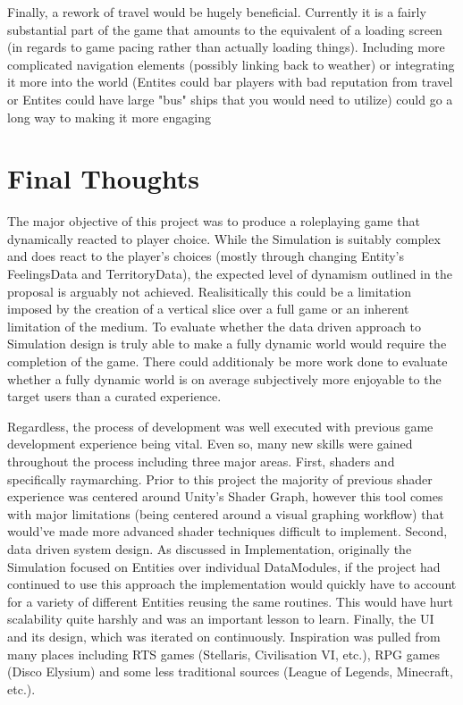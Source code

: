 \documentclass{report}
\begin{document}
Finally, a rework of travel would be hugely beneficial. Currently it is a fairly substantial part of the game that amounts to the equivalent of a loading screen (in regards to game pacing rather than actually loading things). Including more complicated navigation elements (possibly linking back to weather) or integrating it more into the world (Entites could bar players with bad reputation from travel or Entites could have large "bus" ships that you would need to utilize) could go a long way to making it more engaging


\section{Final Thoughts}

The major objective of this project was to produce a roleplaying game that dynamically reacted to player choice. While the Simulation is suitably complex and does react to the player's choices (mostly through changing Entity's FeelingsData and TerritoryData), the expected level of dynamism outlined in the proposal is arguably not achieved. Realisitically this could be a limitation imposed by the creation of a vertical slice over a full game or an inherent limitation of the medium. To evaluate whether the data driven approach to Simulation design is truly able to make a fully dynamic world would require the completion of the game. There could additionaly be more work done to evaluate whether a fully dynamic world is on average subjectively more enjoyable to the target users than a curated experience. 

Regardless, the process of development was well executed with previous game development experience being vital. Even so, many new skills were gained throughout the process including three major areas. First, shaders and specifically raymarching. Prior to this project the majority of previous shader experience was centered around Unity's Shader Graph, however this tool comes with major limitations (being centered around a visual graphing workflow) that would've made more advanced shader techniques difficult to implement. Second, data driven system design. As discussed in Implementation, originally the Simulation focused on Entities over individual DataModules, if the project had continued to use this approach the implementation would quickly have to account for a variety of different Entities reusing the same routines. This would have hurt scalability quite harshly and was an important lesson to learn. Finally, the UI and its design, which was iterated on continuously. Inspiration was pulled from many places including RTS games (Stellaris, Civilisation VI, etc.), RPG games (Disco Elysium) and some less traditional sources (League of Legends, Minecraft, etc.).
\end{document}
